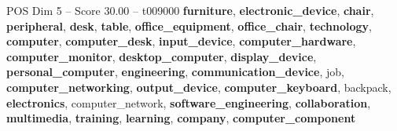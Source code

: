 \begin{textsample}{POS Dim 5 – Score 30.00 – t009000}  \label{ex:f5_pos_022}
\textbf{furniture}, \textbf{electronic\_device}, \textbf{chair}, \textbf{peripheral}, \textbf{desk}, \textbf{table}, \textbf{office\_equipment}, \textbf{office\_chair}, \textbf{technology}, \textbf{computer}, \textbf{computer\_desk}, \textbf{input\_device}, \textbf{computer\_hardware}, \textbf{computer\_monitor}, \textbf{desktop\_computer}, \textbf{display\_device}, \textbf{personal\_computer}, \textbf{engineering}, \textbf{communication\_device}, job, \textbf{computer\_networking}, \textbf{output\_device}, \textbf{computer\_keyboard}, backpack, \textbf{electronics}, computer\_network, \textbf{software\_engineering}, \textbf{collaboration}, \textbf{multimedia}, \textbf{training}, \textbf{learning}, \textbf{company}, \textbf{computer\_component}

\end{textsample}
